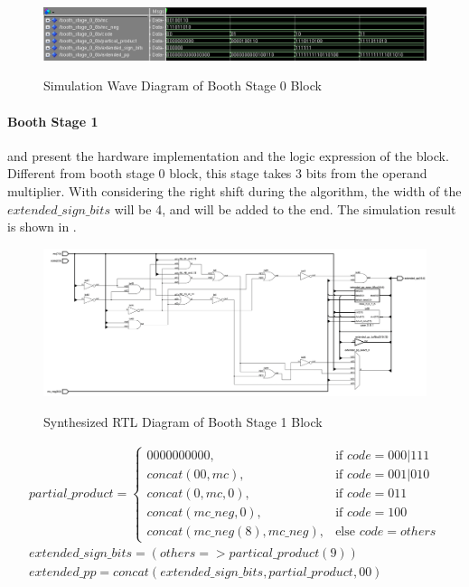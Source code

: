 \begin{figure}[!ht]
	\centering
	\caption{Simulation Wave Diagram of Booth Stage 0 Block}
	\includegraphics[width=\textwidth]{../img/booth_stage_0_sim.png}
	\label{fig:booth_stage_0_sim}
\end{figure}

\paragraph{Booth Stage 1}
 and  present the hardware implementation and the logic expression of the block.
Different from booth stage 0 block, this stage takes 3 bits from the operand multiplier.
With considering the right shift during the algorithm, the width of the \(extended\_sign\_bits\) will be 4,
and  will be added to the end.
The simulation result is shown in .

\begin{figure}[!ht]
	\centering
	\caption{Synthesized RTL Diagram of Booth Stage 1 Block}
	\includegraphics[width=\textwidth]{../img/booth_stage_1_rtl.png}
	\label{fig:booth_stage_1_rtl}
\end{figure}

\begin{equation}
	\begin{array}{c}
		partial\_product =
		\begin{cases}
			0000000000,                 & \text{if } code = 000 | 111 \\
			concat(00, mc),             & \text{if } code = 001 | 010 \\
			concat(0, mc, 0),           & \text{if } code = 011       \\
			concat(mc\_neg, 0),         & \text{if } code = 100       \\
			concat(mc\_neg(8),mc\_neg), & \text{else } code = others
		\end{cases} \\
		extended\_sign\_bits = (others => partical\_product(9))   \\
		extended\_pp = concat(extended\_sign\_bits, partial\_product, 00)
	\end{array}
	\label{exp:booth_stage_1}
\end{equation}

